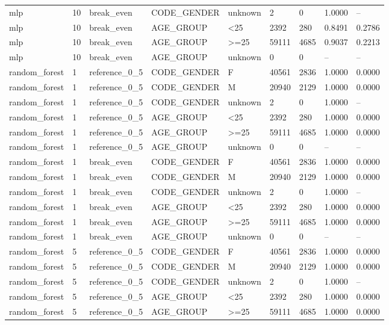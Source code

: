 \begin{longtable}{lllllllll}
mlp & 10 & break\_even & CODE\_GENDER & unknown & 2 & 0 & 1.0000 & -- \\
mlp & 10 & break\_even & AGE\_GROUP & <25 & 2392 & 280 & 0.8491 & 0.2786 \\
mlp & 10 & break\_even & AGE\_GROUP & >=25 & 59111 & 4685 & 0.9037 & 0.2213 \\
mlp & 10 & break\_even & AGE\_GROUP & unknown & 0 & 0 & -- & -- \\
random\_forest & 1 & reference\_0\_5 & CODE\_GENDER & F & 40561 & 2836 & 1.0000 & 0.0000 \\
random\_forest & 1 & reference\_0\_5 & CODE\_GENDER & M & 20940 & 2129 & 1.0000 & 0.0000 \\
random\_forest & 1 & reference\_0\_5 & CODE\_GENDER & unknown & 2 & 0 & 1.0000 & -- \\
random\_forest & 1 & reference\_0\_5 & AGE\_GROUP & <25 & 2392 & 280 & 1.0000 & 0.0000 \\
random\_forest & 1 & reference\_0\_5 & AGE\_GROUP & >=25 & 59111 & 4685 & 1.0000 & 0.0000 \\
random\_forest & 1 & reference\_0\_5 & AGE\_GROUP & unknown & 0 & 0 & -- & -- \\
random\_forest & 1 & break\_even & CODE\_GENDER & F & 40561 & 2836 & 1.0000 & 0.0000 \\
random\_forest & 1 & break\_even & CODE\_GENDER & M & 20940 & 2129 & 1.0000 & 0.0000 \\
random\_forest & 1 & break\_even & CODE\_GENDER & unknown & 2 & 0 & 1.0000 & -- \\
random\_forest & 1 & break\_even & AGE\_GROUP & <25 & 2392 & 280 & 1.0000 & 0.0000 \\
random\_forest & 1 & break\_even & AGE\_GROUP & >=25 & 59111 & 4685 & 1.0000 & 0.0000 \\
random\_forest & 1 & break\_even & AGE\_GROUP & unknown & 0 & 0 & -- & -- \\
random\_forest & 5 & reference\_0\_5 & CODE\_GENDER & F & 40561 & 2836 & 1.0000 & 0.0000 \\
random\_forest & 5 & reference\_0\_5 & CODE\_GENDER & M & 20940 & 2129 & 1.0000 & 0.0000 \\
random\_forest & 5 & reference\_0\_5 & CODE\_GENDER & unknown & 2 & 0 & 1.0000 & -- \\
random\_forest & 5 & reference\_0\_5 & AGE\_GROUP & <25 & 2392 & 280 & 1.0000 & 0.0000 \\
random\_forest & 5 & reference\_0\_5 & AGE\_GROUP & >=25 & 59111 & 4685 & 1.0000 & 0.0000 \\

\end{longtable}
